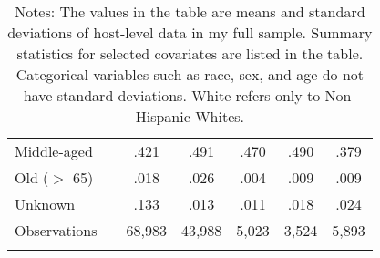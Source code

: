 {\begin{longtable}{l*{6}{c}}
		\hspace{3mm}Middle-aged     & &      .421         &       .491        &      .470         &      .490 		& 		.379         \\
		\hspace{3mm}Old ($>$ 65)     & &      .018         &       .026         &      .004         &      .009	& 		.009         \\
		\hspace{3mm}Unknown    &  &      .133    &       .013         &      .011         &      .018 	& 		.024         \\
		[1em]

		
		\hline
		Observations    &  & 68,983   &       43,988         &       5,023         &       3,524         &       5,893         \\
		\hline\hline
		\caption*{Notes: The values in the table are means and standard deviations of host-level data in my full sample. Summary statistics for selected covariates are listed in the table. Categorical variables such as race, sex, and age do not have standard deviations. White refers only to Non-Hispanic Whites.}
		
	\end{longtable}
}

